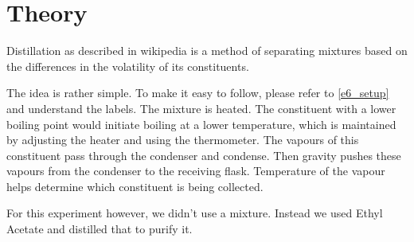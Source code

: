 \section{Theory}
	Distillation as described in wikipedia is a method of separating mixtures based on the differences in the volatility of its constituents.
	\par
	The idea is rather simple. To make it easy to follow, please refer to \autoref{e6_setup} and understand the labels. The mixture is heated. The constituent with a lower boiling point would initiate boiling at a lower temperature, which is maintained by adjusting the heater and using the thermometer. The vapours of this constituent pass through the condenser and condense. Then gravity pushes these vapours from the condenser to the receiving flask. Temperature of the vapour helps determine which constituent is being collected.
	\par
	For this experiment however, we didn't use a mixture. Instead we used Ethyl Acetate and distilled that to purify it.

